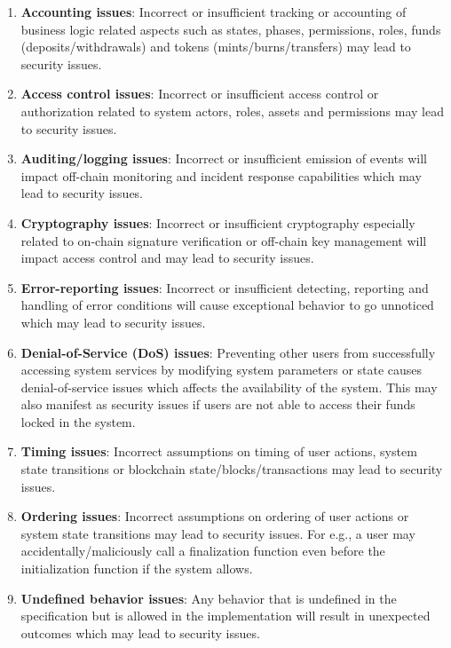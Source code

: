 \begin{enumerate}
\item\textbf{Accounting issues}: Incorrect or insufficient tracking or accounting of business logic related aspects such as states, phases, permissions, roles, funds (deposits/withdrawals) and tokens (mints/burns/transfers) may lead to security issues.

\item\textbf{Access control issues}: Incorrect or insufficient access control or authorization related to system actors, roles, assets and permissions may lead to security issues.

\item\textbf{Auditing/logging issues}: Incorrect or insufficient emission of events will impact off-chain monitoring and incident response capabilities which may lead to security issues.

\item\textbf{Cryptography issues}: Incorrect or insufficient cryptography especially related to on-chain signature verification or off-chain key management will impact access control and may lead to security issues.

\item\textbf{Error-reporting issues}: Incorrect or insufficient detecting, reporting and handling of error conditions will cause exceptional behavior to go unnoticed which may lead to security issues.

\item\textbf{Denial-of-Service (DoS) issues}: Preventing other users from successfully accessing system services by modifying system parameters or state causes denial-of-service issues which affects the availability of the system. This may also manifest as security issues if users are not able to access their funds locked in the system.

\item\textbf{Timing issues}: Incorrect assumptions on timing of user actions, system state transitions or blockchain state/blocks/transactions may lead to security issues.

\item\textbf{Ordering issues}: Incorrect assumptions on ordering of user actions or system state transitions may lead to security issues. For e.g., a user may accidentally/maliciously call a finalization function even before the initialization function if the system allows.

\item\textbf{Undefined behavior issues}: Any behavior that is undefined in the specification but is allowed in the implementation will result in unexpected outcomes which may lead to security issues.


\end{enumerate}
